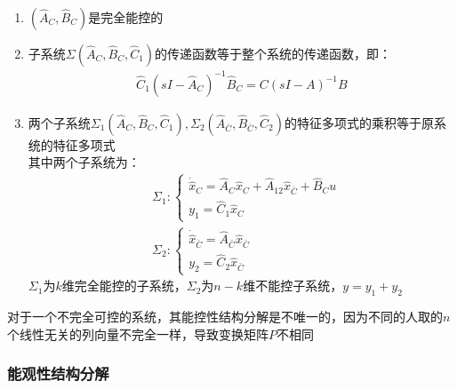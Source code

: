 \begin{anymark}[能控性结构分解]
    \begin{enumerate}
        \item $(\hat{A}_C,\hat{B}_C)$是完全能控的
        \item 子系统$\Sigma(\hat{A}_C,\hat{B}_C,\hat{C}_1)$的传递函数等于整个系统的传递函数，即：
        \begin{gather*}
            \hat{C}_1 (sI - \hat{A}_C)^{-1} \hat{B}_C = C (sI - A)^{-1} B
        \end{gather*}
        \item 两个子系统$\Sigma_1(\hat{A}_C,\hat{B}_C,\hat{C}_1),\Sigma_2(\hat{A}_{\bar{C}},\hat{B}_{\bar{C}},\hat{C}_2)$的特征多项式的乘积等于原系统的特征多项式\\
        其中两个子系统为：
        \begin{equation*}
            \begin{split}
                &\Sigma_1:\begin{cases}
                \dot{\hat{x}}_C = \hat{A}_C \hat{x}_C + \hat{A}_{12} \hat{x}_{\bar{C}} + \hat{B}_C u\\
                y_1 = \hat{C}_1 \hat{x}_C
                \end{cases} \\
                &\Sigma_2:\begin{cases}
                    \dot{\hat{x}}_{\bar{C}} = \hat{A}_{\bar{C}} \hat{x}_{\bar{C}} \\
                    y_2 = \hat{C}_2 \hat{x}_{\bar{C}}
                \end{cases}
            \end{split}
        \end{equation*}
        $\Sigma_1$为$k$维完全能控的子系统，$\Sigma_2$为$n-k$维不能控子系统，$y = y_1 + y_2$
    \end{enumerate}
    \begin{marker}
        对于一个不完全可控的系统，其能控性结构分解是不唯一的，因为不同的人取的$n$个线性无关的列向量不完全一样，导致变换矩阵$P$不相同
    \end{marker}
\end{anymark}

\subsubsection{能观性结构分解}

